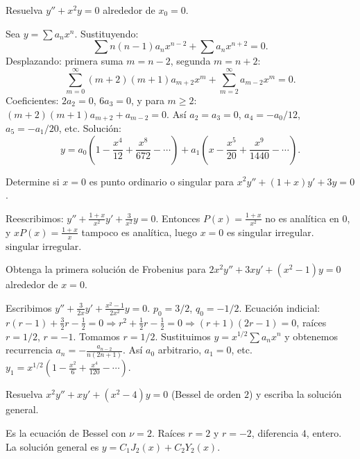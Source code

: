 \begin{prob}
  Resuelva $y'' + x^2 y = 0$ alrededor de $x_0=0$.
  \begin{myproof}
    Sea $y=\sum a_n x^n$. Sustituyendo:
    \[
      \sum n(n-1)a_n x^{n-2} + \sum a_n x^{n+2}=0.
    \]
    Desplazando: primera suma $m=n-2$, segunda $m=n+2$:
    \[
      \sum_{m=0}^{\infty} (m+2)(m+1)a_{m+2}x^m + \sum_{m=2}^{\infty} a_{m-2}x^m=0.
    \]
    Coeficientes: $2a_2=0$, $6a_3=0$, y para $m\ge2$: $(m+2)(m+1)a_{m+2}+a_{m-2}=0$.
    Así $a_2=a_3=0$, $a_4=-a_0/12$, $a_5=-a_1/20$, etc. Solución:
    \[
      \boxed{
        y=a_0\left(1-\frac{x^4}{12}+\frac{x^8}{672}-\cdots\right)
        + a_1\left(x-\frac{x^5}{20}+\frac{x^9}{1440}-\cdots\right)
      }.
    \]
  \end{myproof}
\end{prob}

\begin{prob}
  Determine si $x=0$ es punto ordinario o singular para $x^2 y'' + (1+x)y' + 3y=0$.
  \begin{myproof}
    Reescribimos: $y''+\frac{1+x}{x^2}y'+\frac{3}{x^2}y=0$. Entonces $P(x)=\frac{1+x}{x^2}$ no es analítica en $0$, y $xP(x)=\frac{1+x}{x}$ tampoco es analítica, luego $x=0$ es singular irregular. $\boxed{\text{singular irregular}}$.
  \end{myproof}
\end{prob}

\begin{prob}
  Obtenga la primera solución de Frobenius para $2x^2 y'' + 3x y' + (x^2-1)y=0$ alrededor de $x=0$.
  \begin{myproof}
    Escribimos $y''+\frac{3}{2x}y'+\frac{x^2-1}{2x^2}y=0$. $p_0=3/2$, $q_0=-1/2$. Ecuación indicial: $r(r-1)+\frac{3}{2}r-\frac{1}{2}=0 \Rightarrow r^2+\frac{1}{2}r-\frac{1}{2}=0 \Rightarrow (r+1)(2r-1)=0$, raíces $r=1/2$, $r=-1$. Tomamos $r=1/2$. Sustituimos $y=x^{1/2}\sum a_n x^n$ y obtenemos recurrencia $a_n = -\frac{a_{n-2}}{n(2n+1)}$. Así $a_0$ arbitrario, $a_1=0$, etc. $\boxed{y_1=x^{1/2}\left(1-\frac{x^2}{6}+\frac{x^4}{120}-\cdots\right)}$.
  \end{myproof}
\end{prob}

\begin{prob}
  Resuelva $x^2 y'' + x y' + (x^2-4)y=0$ (Bessel de orden $2$) y escriba la solución general.
  \begin{myproof}
    Es la ecuación de Bessel con $\nu=2$. Raíces $r=2$ y $r=-2$, diferencia $4$, entero. La solución general es $\boxed{y=C_1 J_2(x)+C_2 Y_2(x)}$.
  \end{myproof}
\end{prob}

